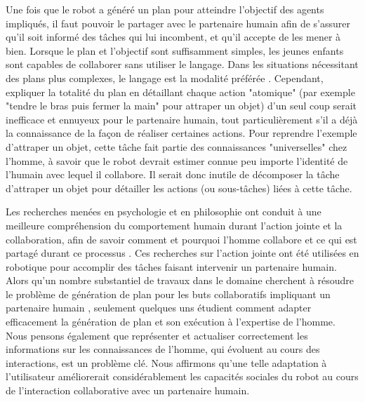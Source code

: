 \documentclass[a4paper,11pt,twoside]{StyleThese}
\begin{document}
Une fois que le robot a généré un plan pour atteindre l'objectif des agents impliqués, il faut pouvoir le partager avec le partenaire humain afin de s'assurer qu'il soit informé des tâches qui lui incombent, et qu'il accepte de les mener à bien. Lorsque le plan et l'objectif sont suffisamment simples, les jeunes enfants sont capables de collaborer sans utiliser le langage. Dans les situations nécessitant des plans plus complexes, le langage est la modalité préférée \cite{Warneken2006,Warneken2007}. Cependant, expliquer la totalité du plan en détaillant chaque action "atomique" (par exemple "tendre le bras puis fermer la main" pour attraper un objet) d'un seul coup serait inefficace et ennuyeux pour le partenaire humain, tout particulièrement s'il a déjà la connaissance de la façon de réaliser certaines actions. Pour reprendre l'exemple d'attraper un objet, cette tâche fait partie des connaissances "universelles" chez l'homme, à savoir que le robot devrait estimer connue peu importe l'identité de l'humain avec lequel il collabore. Il serait donc inutile de décomposer la tâche d'attraper un objet pour détailler les actions (ou sous-tâches) liées à cette tâche. 

Les recherches menées en psychologie et en philosophie ont conduit à une meilleure compréhension du comportement humain durant l'action jointe et la collaboration, afin de savoir comment \cite{tomasello2005} et pourquoi \cite{tomasello2009} l'homme collabore et ce qui est partagé durant ce processus \cite{Butterfill2011}.
%
%
%
%
Ces recherches sur l'action jointe ont été utilisées en robotique pour accomplir des tâches faisant intervenir un partenaire humain. Alors qu'un nombre substantiel de travaux dans le domaine cherchent à résoudre le problème de génération de plan pour les buts collaboratifs impliquant un partenaire humain \cite{lallement14}, seulement quelques uns étudient comment adapter efficacement la génération de plan et son exécution à l'expertise de l'homme. Nous pensons également que représenter et actualiser correctement les informations sur les connaissances de l'homme, qui évoluent au cours des interactions, est un problème clé. Nous affirmons qu'une telle adaptation à l'utilisateur améliorerait considérablement les capacités sociales du robot au cours de l'interaction collaborative avec un partenaire humain.
\end{document}
